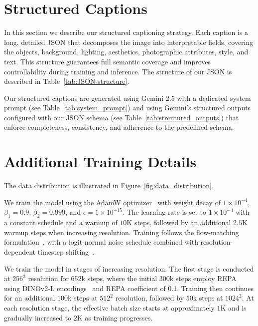 \clearpage

\begin{appendices}
\section{Structured Captions}
\label{app:structured-json}

In this section we describe our structured captioning strategy. 
Each caption is a long, detailed JSON that decomposes the image into interpretable fields, covering the objects, background, lighting, aesthetics, photographic attributes, style, and text. This structure guarantees full semantic coverage and improves controllability during training and inference.
The structure of our JSON is described in Table~\ref{tab:JSON-structure}. 

Our structured captions are generated using Gemini 2.5 with a dedicated system prompt (see Table~\ref{tab:system_prompt}) and using Gemini's structured outputs configured with our JSON schema (see Table~\ref{tab:strcutured_outputs}) that enforce completeness, consistency, and adherence to the predefined schema. 







\section{Additional Training Details}\label{sec:additional-training-details}

The data distribution is illustrated in Figure~\ref{fig:data_distribution}.



We train the model using the AdamW optimizer~\cite{loshchilov2017decoupled} with weight decay of $1\times10^{-4}$, $\beta_1=0.9$, $\beta_2=0.999$, and $\epsilon=1\times10^{-15}$. The learning rate is set to $1\times10^{-4}$ with a constant schedule and a warmup of $10$K steps, followed by an additional $2.5$K warmup steps when increasing resolution. Training follows the flow-matching formulation~\cite{lipman2023flowmatchinggenerativemodeling}, with a logit-normal noise schedule combined with resolution-dependent timestep shifting~\cite{esser2024scaling}.


We train the model in stages of increasing resolution. The first stage is conducted at $256^2$ resolution for $652$k steps, where the initial $300$k steps employ REPA~\cite{yu2024representation} using DINOv2-L encodings~\cite{oquab2023dinov2} and REPA coefficient of 0.1. Training then continues for an additional $100$k steps at $512^2$ resolution, followed by $50$k steps at $1024^2$. At each resolution stage, the effective batch size starts at approximately $1$K and is gradually increased to $2$K as training progresses.


\end{appendices}
